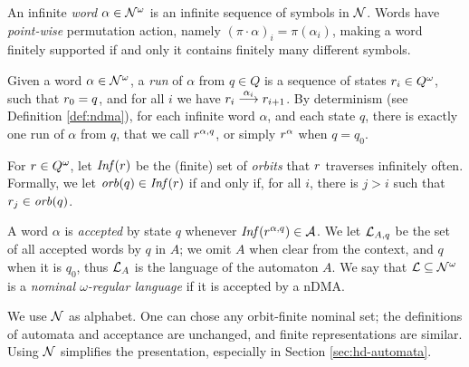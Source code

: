\begin{definition}
\label{def:inf-word}
 An infinite \emph{word} $\alpha \in \mathcal{N}^\omega$ is an infinite sequence of symbols in $\mathcal{N}$. Words have \emph{point-wise} permutation action, namely $(\pi \cdot \alpha)_i = \pi(\alpha_i)$, making a word finitely supported if and only it contains finitely many different symbols. 
\end{definition}

\begin{definition}\label{def:nominal-run}
 Given a word $\alpha \in \mathcal{N}^\omega$, a \emph{run} of $\alpha$ from $q \in Q$ is a sequence of states $r_i \in Q^\omega$, such that $r_0 = q$, and for all $i$ we have $r_i \overset{\alpha_i}{\longrightarrow} r_{i+1}$. 
 By determinism (see Definition \ref{def:ndma}), for each infinite word $\alpha$, and each state $q$, there is exactly one run of $\alpha$ from $q$, that we call $r^{\alpha,q}$, or simply $r^{\alpha}$ when $q=q_0$.
\end{definition}

\begin{definition}\label{def:inf-set}
 For $r \in Q^\omega$, let $\mathit{Inf}(r)$ be the (finite) set of \emph{orbits} that $r$ traverses infinitely often. Formally, we let $\mathit{orb}(q) \in \mathit{Inf}(r)$ if and only if, for all $i$, there is $j > i$ such that $r_j \in \mathit{orb}(q)$.
\end{definition}

\begin{definition}
 A word $\alpha$ is \emph{accepted} by state $q$ whenever $\mathit{Inf}(r^{\alpha,q}) \in \mathcal{A}$. We let $\mathcal{L}_{A,q}$ be the set of all accepted words by $q$ in $A$; we omit $A$ when clear from the context, and $q$ when it is $q_0$, thus $\mathcal{L}_A$ is the language of the automaton $A$. We say that $\mathcal{L} \subseteq \mathcal{N}^\omega$ is a \emph{nominal $\omega$-regular language} if it is accepted by a nDMA.
\end{definition}

\begin{remark}\label{rem:simple-alphabet} We use $\mathcal{N}$ as alphabet. One can chose any orbit-finite nominal set; the definitions of automata and acceptance are unchanged, and finite representations are similar.
%
Using $\mathcal{N}$ simplifies the presentation, especially in Section \ref{sec:hd-automata}.
\end{remark}

